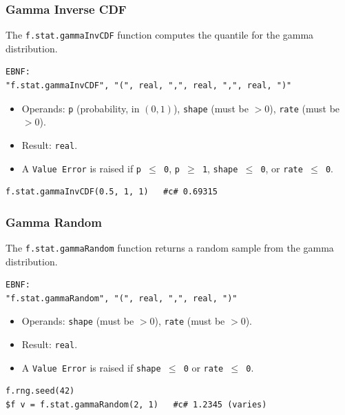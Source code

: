 \subsubsection{Gamma Inverse CDF}
The \texttt{f.stat.gammaInvCDF} function computes the quantile for the gamma distribution.
\begin{verbatim}
EBNF:
"f.stat.gammaInvCDF", "(", real, ",", real, ",", real, ")"
\end{verbatim}
\begin{itemize}
\item Operands: \texttt{p} (probability, in $(0, 1)$), \texttt{shape} (must be $> 0$), \texttt{rate} (must be $> 0$).
\item Result: \texttt{real}.
\item A \texttt{Value Error} is raised if \texttt{p $\leq$ 0}, \texttt{p $\geq$ 1}, \texttt{shape $\leq$ 0}, or \texttt{rate $\leq$ 0}.
\end{itemize}
\begin{verbatim}
f.stat.gammaInvCDF(0.5, 1, 1)   #c# 0.69315
\end{verbatim}

\subsubsection{Gamma Random}
The \texttt{f.stat.gammaRandom} function returns a random sample from the gamma distribution.
\begin{verbatim}
EBNF:
"f.stat.gammaRandom", "(", real, ",", real, ")"
\end{verbatim}
\begin{itemize}
\item Operands: \texttt{shape} (must be $> 0$), \texttt{rate} (must be $> 0$).
\item Result: \texttt{real}.
\item A \texttt{Value Error} is raised if \texttt{shape $\leq$ 0} or \texttt{rate $\leq$ 0}.
\end{itemize}
\begin{verbatim}
f.rng.seed(42)
$f v = f.stat.gammaRandom(2, 1)   #c# 1.2345 (varies)
\end{verbatim}

